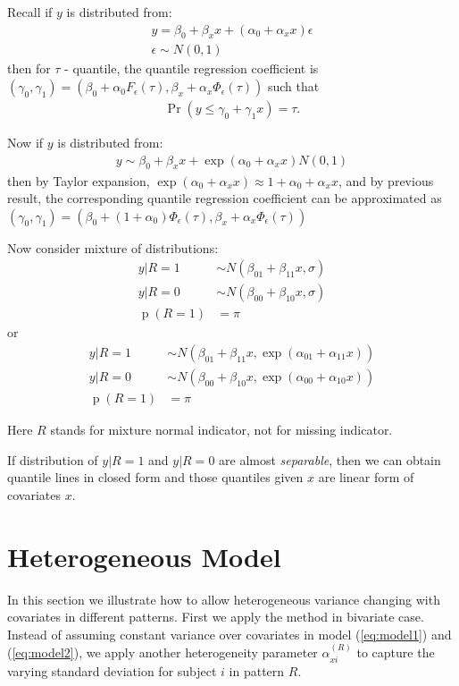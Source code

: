 \documentclass[12pt]{article}
\DeclareMathOperator{\pr}{p}
\DeclareMathOperator{\prob}{Pr}
\begin{document}
Recall if $y$ is distributed from:
\begin{align*}
  y =  \beta_0 + \beta_x x + (\alpha_0 + \alpha_xx) \epsilon \\
  \epsilon \sim N(0, 1)
\end{align*}
then for $\tau$ - quantile, the quantile regression coefficient is
$(\gamma_0, \gamma_1) = (\beta_0 + \alpha_0F_{\epsilon}(\tau), \beta_x
+ \alpha_x\Phi_{\epsilon}(\tau))$ such that
\begin{align*}
  \prob (y \leq \gamma_0 + \gamma_1x) = \tau.
\end{align*}

Now if $y$ is distributed from:
\begin{align*}
  y \sim \beta_0 + \beta_x x + \exp(\alpha_0 + \alpha_xx) N(0, 1)
\end{align*}
then by Taylor expansion, $\exp(\alpha_0 + \alpha_xx) \approx 1 +
\alpha_0 + \alpha_xx$, and by previous result, the corresponding
quantile regression coefficient can be approximated as $(\gamma_0,
\gamma_1) = (\beta_0 + (1 + \alpha_0)\Phi_{\epsilon}(\tau), \beta_x +
\alpha_x\Phi_{\epsilon}(\tau))$

Now consider mixture of distributions:
\begin{align*}
  y | R = 1 & \sim N(\beta_{01} + \beta_{11}x,  \sigma)\\
  y | R = 0 & \sim N(\beta_{00} + \beta_{10}x, \sigma) \\
  \pr (R = 1) & = \pi
\end{align*}
or
\begin{align*}
  y | R = 1 & \sim N(\beta_{01} + \beta_{11}x,  \exp(\alpha_{01} + \alpha_{11}x))\\
  y | R = 0 & \sim N(\beta_{00} + \beta_{10}x, \exp(\alpha_{00}+ \alpha_{10}x)) \\
  \pr (R = 1) & = \pi
\end{align*}

Here $R$ stands for mixture normal indicator, not for missing
indicator.

If distribution of $y|R = 1$ and $y | R = 0$ are almost
\textit{separable}, then we can obtain quantile lines in closed form
and those quantiles given $x$ are linear form of covariates $x$.


\section{Heterogeneous Model}
\label{sec:heter}

In this section we illustrate how to allow heterogeneous variance
changing with covariates in different patterns.  First we apply the
method in bivariate case. Instead of assuming constant variance over
covariates in model (\ref{eq:model1}) and (\ref{eq:model2}), we apply
another heterogeneity parameter $\alpha_{xi}^{(R)}$ to capture the
varying standard deviation for subject $i$ in pattern $R$.
\end{document}

